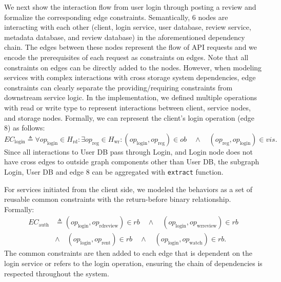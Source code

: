 We next show the interaction flow from user login through posting a review
and formalize the corresponding edge constraints.
Semantically, 6 nodes are interacting with each other (client,
  login service, user database, review service, metadata database,
and review database) in the aforementioned dependency chain.
The edges between these nodes represent the flow of API requests and we
encode the prerequisites of each request as constraints on edges.
Note that all constraints on edges can be
directly added to the nodes.
However, when modeling services with complex interactions 
with cross storage system dependencies, 
edge constraints can clearly
separate the providing/requiring constraints from downstream
service logic. In the implementation, we defined multiple operations
with read or write type to represent interactions between client,
service nodes, and storage nodes.
Formally, we can represent the client's login operation (edge 8) as follows:
\[
  EC_{\text{login}} \triangleq \forall op_{\text{login}} \in H_{\text{rd}} : \exists op_{\text{reg}} \in H_{\text{wr}} :
  (op_{\text{login}}, op_{\text{reg}}) \in ob \quad \land \quad (op_{\text{reg}}, op_{\text{login}}) \in vis.
\]
Since all interactions to User DB pass through Login, and Login node does not have cross
edges to outside graph components other than User DB, the subgraph Login, User DB and
edge 8 can be aggregated with \texttt{extract} function.

For services initiated from the client side, we modeled the behaviors
as a set of reusable common constraints with the return-before
binary relationship. Formally:
\begin{align*}
  EC_{\text{auth}} &\triangleq
  (op_{\text{login}}, op_{\text{rdreview}}) \in rb \quad \land \quad
  (op_{\text{login}}, op_{\text{wrreview}}) \in rb \\ 
	&\land \quad (op_{\text{login}}, op_{\text{rent}}) \in rb \quad \land \quad
  (op_{\text{login}}, op_{\text{watch}}) \in rb.
\end{align*}
The common constraints are then added to each edge that is dependent on the
login service or refers to the login operation, ensuring the chain
of dependencies is respected throughout the system.

